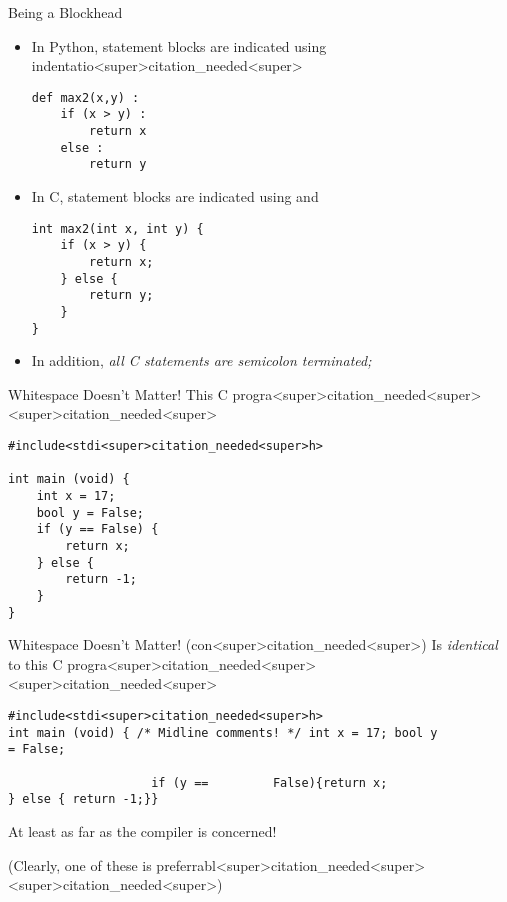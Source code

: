 \documentclass[11pt]{beamer}
\let\OldTexttt\texttt
\renewcommand{\texttt}[1]{\OldTexttt{\color{teal}{#1}}}
\begin{document}
\begin{frame}[fragile=singleslide]{Being a Blockhead}
\begin{itemize}
\item In Python, statement blocks are indicated using indentatio<super>citation_needed<super>
\begin{lstlisting}[style=Python]
def max2(x,y) :
	if (x > y) :
		return x
	else :
		return y
\end{lstlisting}
\item In C, statement blocks are indicated using \texttt{$\{$} and \texttt{$\}$}
\begin{lstlisting}[style=C]
int max2(int x, int y) {
	if (x > y) {
		return x;
	} else {
		return y;
	}
}
\end{lstlisting}
\item In addition, \emph{all C statements are semicolon terminated;}
\end{itemize}
\end{frame}

\begin{frame}[fragile=singleslide]{Whitespace Doesn't Matter!}
This C progra<super>citation_needed<super><super>citation_needed<super>
\begin{lstlisting}[style=C]
#include<stdi<super>citation_needed<super>h>

int main (void) { 
	int x = 17;
	bool y = False;
	if (y == False) {
		return x;
	} else {
		return -1;
	}
}
\end{lstlisting}
\end{frame}
\begin{frame}[fragile=singleslide]{Whitespace Doesn't Matter! (con<super>citation_needed<super>)}
Is \emph{identical} to this C progra<super>citation_needed<super><super>citation_needed<super>
\begin{lstlisting}[style=C]
#include<stdi<super>citation_needed<super>h>
int main (void) { /* Midline comments! */ int x = 17; bool y 
= False;
	
					if (y ==         False){return x;
} else { return -1;}}
\end{lstlisting}
At least as far as the compiler is concerned! 

(Clearly, one of these is preferrabl<super>citation_needed<super><super>citation_needed<super>)
\end{frame}
\end{document}
